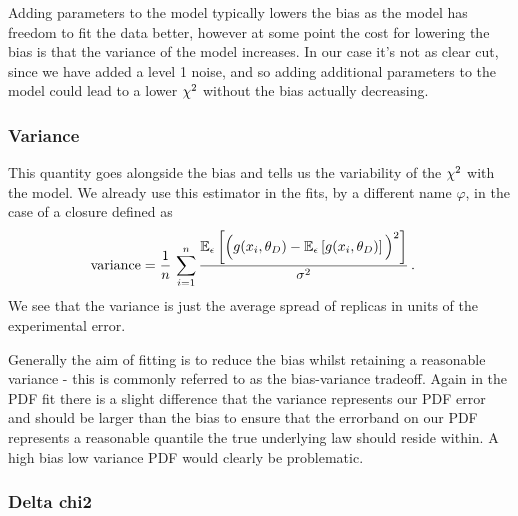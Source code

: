 Adding parameters to the model
typically lowers the bias as the model has freedom to fit the data better, however at some point the
cost for lowering the bias is that the variance of the model increases. In our
case it's not as clear cut, since we have added a level 1 noise, and so adding
additional parameters to the model could lead to a lower $\chi^{2}$ without the bias
actually decreasing.

\subsubsection*{Variance}

This quantity goes alongside the bias and tells us the variability of the
$\chi^{2}$ with the model. We already use this estimator in the fits, by a
different name $\varphi$, in the case of a closure defined as
%
\begin{equation}
    \begin{split}
        \mathrm{variance} &= \frac{1}{n}\, \sum_{i=1}^{n} \frac{
            \mathbb{E}_{\epsilon}\left[\Big(g(x_i,\theta_D) - 
            \mathbb{E}_{\epsilon}\left[g(x_i,\theta_D)\right]\Big)^2\right]
        }{\sigma^2} \, .
    \end{split}
\end{equation}
%
We see
that the variance is just the average spread of replicas in units of the
experimental error.

Generally the aim of fitting is to reduce the bias whilst retaining a reasonable
variance - this is commonly referred to as the bias-variance tradeoff. Again
in the PDF fit there is a slight difference that the variance represents our PDF
error and should be larger than the bias to ensure that the errorband on our
PDF represents a reasonable quantile the true underlying law should reside
within. A high bias low variance PDF would clearly be problematic.

\subsubsection*{Delta chi2}

